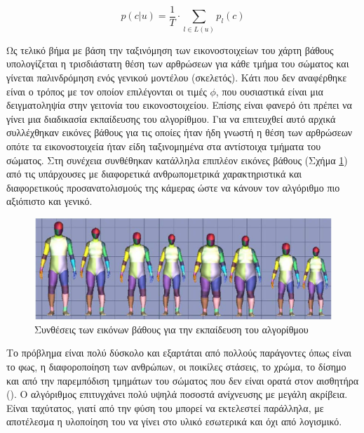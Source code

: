 \begin{equation}
    p(c|u) = \frac{1}{T} \cdot \sum_{l \in L(u)} p_{l}(c)
    \label{equ:kinect-algorithm-pixel-probability}
\end{equation}

Ως τελικό βήμα με βάση την ταξινόμηση των εικονοστοιχείων του χάρτη βάθους υπολογίζεται η τρισδιάστατη θέση των αρθρώσεων για κάθε τμήμα του σώματος και γίνεται παλινδρόμηση ενός γενικού μοντέλου (σκελετός). Κάτι που δεν αναφέρθηκε είναι ο τρόπος με τον οποίον επιλέγονται οι τιμές $\phi$, που ουσιαστικά είναι μια δειγματοληψία στην γειτονία του εικονοστοιχείου. Επίσης είναι φανερό ότι πρέπει να γίνει μια διαδικασία εκπαίδευσης του αλγορίθμου. Για να επιτευχθεί αυτό αρχικά συλλέχθηκαν εικόνες βάθους για τις οποίες ήταν ήδη γνωστή η θέση των αρθρώσεων οπότε τα εικονοστοιχεία ήταν είδη ταξινομημένα στα αντίστοιχα τμήματα του σώματος. Στη συνέχεια συνθέθηκαν κατάλληλα επιπλέον εικόνες βάθους (Σχήμα \ref{fig:kinect-data-synthesis}) από τις υπάρχουσες με διαφορετικά ανθρωπομετρικά χαρακτηριστικά και διαφορετικούς προσανατολισμούς της κάμερας ώστε να κάνουν τον αλγόριθμο πιο αξιόπιστο και γενικό.

\begin{figure}[H]
    \centering
    \includegraphics[width=.7\textwidth, keepaspectratio]{fig/kinect-data-synthesis.png}
    \caption{Συνθέσεις των εικόνων βάθους για την εκπαίδευση του αλγορίθμου \cite{shotton11}}
    \label{fig:kinect-data-synthesis}
\end{figure}

Το πρόβλημα είναι πολύ δύσκολο και εξαρτάται από πολλούς παράγοντες όπως είναι το φως, η διαφοροποίηση των ανθρώπων, οι ποικίλες στάσεις, το χρώμα, το δίσημο και από την παρεμπόδιση τμημάτων του σώματος που δεν είναι ορατά στον αισθητήρα (). Ο αλγόριθμος επιτυγχάνει πολύ υψηλά ποσοστά ανίχνευσης με μεγάλη ακρίβεια. Είναι ταχύτατος, γιατί από την φύση του μπορεί να εκτελεστεί παράλληλα, με αποτέλεσμα η υλοποίηση του να γίνει στο υλικό εσωτερικά και όχι από λογισμικό.

